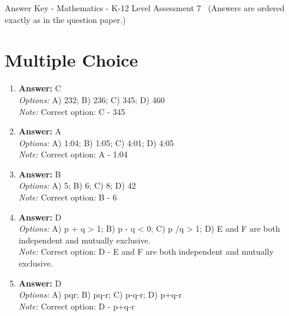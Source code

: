 \documentclass[12pt]{article}
\begin{document}
\begin{center}
Answer Key - Mathematics - K-12 Level Assessment 7 \
\small (Answers are ordered exactly as in the question paper.)
\end{center}

\section*{Multiple Choice}
\begin{enumerate}[label=\arabic*.]
\item \textbf{Answer:} C
\\ \textit{Options:} A) 232; B) 236; C) 345; D) 460
\\ \textit{Note:} Correct option: C - 345
\item \textbf{Answer:} A
\\ \textit{Options:} A) 1:04; B) 1:05; C) 4:01; D) 4:05
\\ \textit{Note:} Correct option: A - 1:04
\item \textbf{Answer:} B
\\ \textit{Options:} A) 5; B) 6; C) 8; D) 42
\\ \textit{Note:} Correct option: B - 6
\item \textbf{Answer:} D
\\ \textit{Options:} A) p + q \textgreater{} 1; B) p - q \textless{} 0; C) p /q \textgreater{} 1; D) E and F are both independent and mutually exclusive.
\\ \textit{Note:} Correct option: D - E and F are both independent and mutually exclusive.
\item \textbf{Answer:} D
\\ \textit{Options:} A) pqr; B) pq-r; C) p-q-r; D) p+q-r
\\ \textit{Note:} Correct option: D - p+q-r
\end{enumerate}
\end{document}
